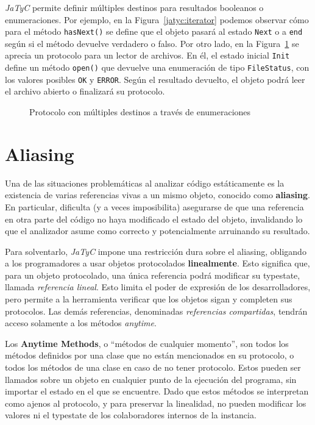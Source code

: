 \textit{JaTyC} permite definir múltiples destinos para resultados booleanos o enumeraciones. Por ejemplo, en la Figura~\ref{jatyc:iterator} podemos observar cómo para el método \texttt{hasNext()} se define que el objeto pasará al estado \texttt{Next} o a \texttt{end} según si el método devuelve verdadero o falso. Por otro lado, en la Figura~\ref{jatyc:enumerations} se aprecia un protocolo para un lector de archivos. En él, el estado inicial \texttt{Init} define un método \texttt{open()} que devuelve una enumeración de tipo \texttt{FileStatus}, con los valores posibles \texttt{OK} y \texttt{ERROR}. Según el resultado devuelto, el objeto podrá leer el archivo abierto o finalizará su protocolo.

\begin{figure}[htbp]
    \centering
    
    \caption{Protocolo con múltiples destinos a través de enumeraciones}
    \label{jatyc:enumerations}
\end{figure}

\section{Aliasing}
\label{aliasing}

Una de las situaciones problemáticas al analizar código estáticamente es la existencia de varias referencias vivas a un mismo objeto, conocido como \textbf{aliasing}. En particular, dificulta (y a veces imposibilita) asegurarse de que una referencia en otra parte del código no haya modificado el estado del objeto, invalidando lo que el analizador asume como correcto y potencialmente arruinando su resultado.

Para solventarlo, \textit{JaTyC} impone una restricción dura sobre el aliasing, obligando a los programadores a usar objetos protocolados \textbf{linealmente}. Esto significa que, para un objeto protocolado, una única referencia podrá modificar su typestate, llamada \textit{referencia lineal}. Esto limita el poder de expresión de los desarrolladores, pero permite a la herramienta verificar que los objetos sigan y completen sus protocolos. Las demás referencias, denominadas \textit{referencias compartidas}, tendrán acceso solamente a los métodos \textit{anytime}.

Los \textbf{Anytime Methods}, o ``métodos de cualquier momento'', son todos los métodos definidos por una clase que no están mencionados en su protocolo, o todos los métodos de una clase en caso de no tener protocolo. Estos pueden ser llamados sobre un objeto en cualquier punto de la ejecución del programa, sin importar el estado en el que se encuentre. Dado que estos métodos se interpretan como ajenos al protocolo, y para preservar la linealidad, no pueden modificar los valores ni el typestate de los colaboradores internos de la instancia.

